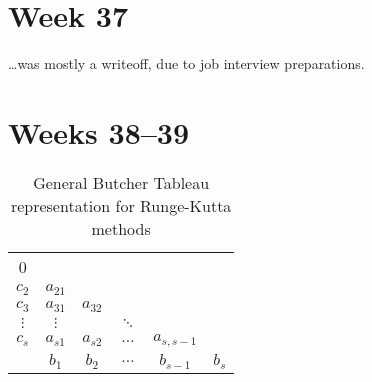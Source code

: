 \section{Week 37}
\label{sec:37}

\ldots was mostly a writeoff, due to job interview preparations.

\section{Weeks 38--39}

\begin{table}[h]
  \caption{General Butcher Tableau representation for Runge-Kutta methods}
  \label{tab:general_butcher_tableau}
  \centering
  \begin{tabular}{c|ccccc}
    0 \\
      $c_{2}$ & $a_{21}$ \\
      $c_{3}$ & $a_{31}$ & $a_{32}$ \\
      $\vdots$ & $\vdots$ & & $\ddots$ \\
      $c_{s}$ & $a_{s1}$ & $a_{s2}$ & $\ldots$ & $a_{s,s-1}$ \\
    \hline
    & $b_{1}$ & $b_{2}$ & $\ldots$ & $b_{s-1}$ & $b_{s}$
  \end{tabular}
\end{table}

